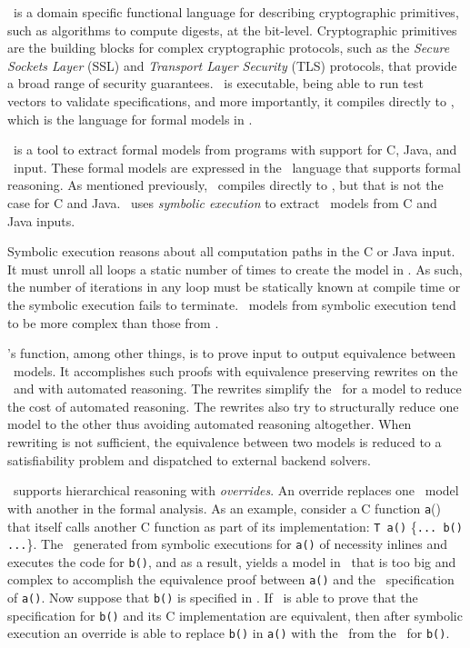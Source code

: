 \cryptol\ is a domain specific functional language for describing cryptographic primitives, such as algorithms to compute digests, at the bit-level.
Cryptographic primitives are the building blocks for complex cryptographic protocols, such as the \emph{Secure Sockets Layer} (SSL) and \emph{Transport Layer Security} (TLS) protocols, that provide a broad range of security guarantees.
\cryptol\ is executable, being able to run test vectors to validate specifications, and more importantly, it compiles directly to \sawcore, which is the language for formal models in \saw.

\saw\ is a tool to extract formal models from programs with support for C, Java, and \cryptol\ input.
These formal models are expressed in the \sawcore\ language that supports formal reasoning.
As mentioned previously, \cryptol\ compiles directly to \sawcore, but that is not the case for C and Java.
\saw\ uses \emph{symbolic execution} to extract \sawcore\ models from C and Java inputs.

Symbolic execution reasons about all computation paths in the C or Java input.
It must unroll all loops a static number of times to create the model in \sawcore.
As such, the number of iterations in any loop must be statically known at compile time or the symbolic execution fails to terminate.
\sawcore\ models from symbolic execution tend to be more complex than those from \cryptol.

\saw's function, among other things, is to prove input to output equivalence between \sawcore\ models.
It accomplishes such proofs with equivalence preserving rewrites on the \sawcore\ and with automated reasoning.
The rewrites simplify the \sawcore\ for a model to reduce the cost of automated reasoning. 
The rewrites also try to structurally reduce one model to the other thus avoiding automated reasoning altogether.
When rewriting is not sufficient, the equivalence between two models is reduced to a satisfiability problem and dispatched to external backend solvers.

\saw\ supports hierarchical reasoning with \emph{overrides}.
An override replaces one \sawcore\ model with another in the formal analysis.
As an example, consider a C function \texttt{a}() that itself calls another C function as part of its implementation: \texttt{T a()} \{\texttt{... b() ...}\}.
The \sawcore\ generated from symbolic executions for \texttt{a()} of necessity inlines and executes the code for \texttt{b()}, and as a result, yields a model in \sawcore\ that is too big and complex to accomplish the equivalence proof between \texttt{a()} and the \cryptol\ specification of \texttt{a()}.
Now suppose that \texttt{b()} is specified in \cryptol.
If \saw\ is able to prove that the specification for \texttt{b()} and its C implementation are equivalent, then after symbolic execution an override is able to replace \texttt{b()} in \texttt{a()} with the \sawcore\ from the \cryptol\ for \texttt{b()}.

